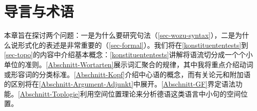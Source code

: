 
\chapter{导言与术语}
\label{Kapitel-Grundbegriffe}

本章旨在探讨两个问题：一是为什么要研究句法（\ref{sec-wozu-syntax}），二是为什么说形式化的表述是非常重要的（\ref{sec-formal}）。我们将在\ref{konstituententests}到\ref{sec-topo}的内容中介绍基本概念：\ref{konstituententests}讲解将语流切分成一个个小单位的准则。\ref{Abschnitt-Wortarten}展示词汇聚合的规律，其中我将重点介绍动词或形容词的分类标准。\ref{Abschnitt-Kopf}介绍中心语的概念，而有关论元和附加语的区别将在\ref{Abschnitt-Argument-Adjunkt}中展开。\ref{Abschnitt-GF}界定语法功能。\ref{Abschnitt-Toplogie}利用空间位置理论来分析德语这类语言中小句的空间位置。

